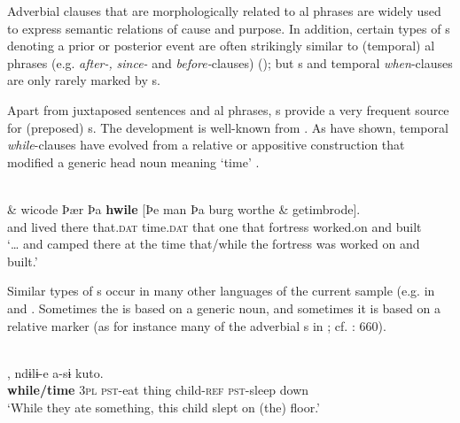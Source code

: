 \documentclass[output=paper]{langsci/langscibook}
\begin{document}
Adverbial clauses that are morphologically related to al phrases are widely used to express semantic relations of cause and purpose. In addition, certain types of s denoting a prior or posterior event are often strikingly similar to (temporal) al phrases (e.g.  \textit{after-,} \textit{since-} and \textit{before-}clauses) (\citealt{Blake1999,Hetterle2015}); but s and temporal \textit{when}-clauses are only rarely marked by s. 

Apart from juxtaposed sentences and al phrases, s provide a very frequent source for (preposed) s. The development is well-known from . As \citet{HopperTraugott2003} have shown, temporal \textit{while}-clauses have evolved from a relative or appositive construction that modified a generic head noun meaning ‘time’ .

\ea\label{ex:diessel:9}
\\
\gll   \& wicode    Þær   Þa   \textbf{hwile}  [Þe   man  Þa   burg  worthe  \& getimbrode].\\
       and  lived   there   that.\textsc{dat}   time.\textsc{dat}  that   one  that   fortress  worked.on  and built\\
\glt `… and camped there at the time that/while the fortress was worked on and built.'
\z

Similar types of s occur in many other languages of the current sample (e.g. in   and  . Sometimes the  is based on a generic noun, and sometimes it is based on a relative marker (as for instance many of the adverbial s in ; cf. \citealt{Heath2005}: 660). 

\ea\label{ex:diessel:10}
\\
,   ndɨlɨ-e   a-sɨ   kuto.\\
        \textbf{while/time} \textsc{3pl}   \textsc{pst-}eat   thing   child-\textsc{ref}   \textsc{pst-}sleep   down\\
\glt   `While they ate something, this child slept on (the) floor.'
\z
\end{document}
